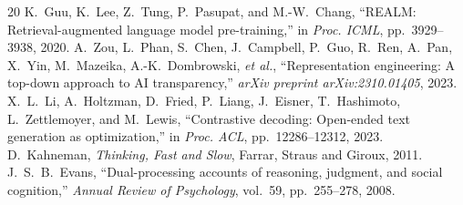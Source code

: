 \documentclass[11pt,a4paper]{article}
\theoremstyle{definition}
\begin{document}
\begin{thebibliography}{20}
 K.~Guu, K.~Lee, Z.~Tung, P.~Pasupat, and M.-W.~Chang, ``REALM: Retrieval-augmented language model pre-training,'' in \textit{Proc. ICML}, pp.~3929--3938, 2020.
 A.~Zou, L.~Phan, S.~Chen, J.~Campbell, P.~Guo, R.~Ren, A.~Pan, X.~Yin, M.~Mazeika, A.-K.~Dombrowski, \textit{et al.}, ``Representation engineering: A top-down approach to AI transparency,'' \textit{arXiv preprint arXiv:2310.01405}, 2023.
 X.~L.~Li, A.~Holtzman, D.~Fried, P.~Liang, J.~Eisner, T.~Hashimoto, L.~Zettlemoyer, and M.~Lewis, ``Contrastive decoding: Open-ended text generation as optimization,'' in \textit{Proc. ACL}, pp.~12286--12312, 2023.
 D.~Kahneman, \textit{Thinking, Fast and Slow}, Farrar, Straus and Giroux, 2011.
 J.~S.~B.~Evans, ``Dual-processing accounts of reasoning, judgment, and social cognition,'' \textit{Annual Review of Psychology}, vol.~59, pp.~255--278, 2008.
\end{thebibliography}
\end{document}
